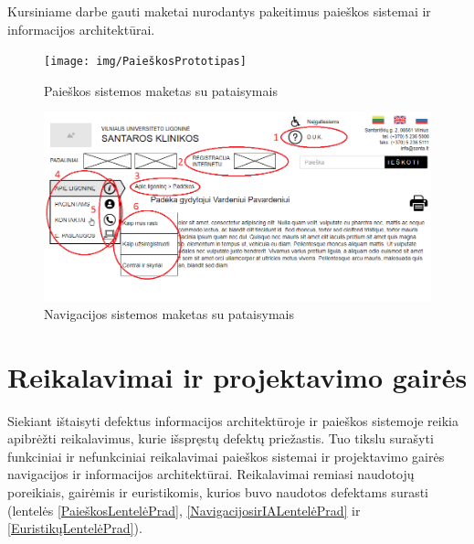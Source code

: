 \documentclass{VUMIFPSkursinis}
\begin{document}
Kursiniame darbe gauti maketai nurodantys pakeitimus paieškos sistemai ir informacijos architektūrai.

\begin{figure}[H]
    \centering
    \texttt{[image: img/PaieškosPrototipas]}
    \caption{Paieškos sistemos maketas su pataisymais}
    \label{img:PaieškosPrototipas}
\end{figure}

\begin{figure}[H]
    \centering
    \includegraphics[scale=0.65]{img/NavigacijosPrototipas}
    \caption{Navigacijos sistemos maketas su pataisymais}
    \label{img:NavigacijosPrototipas}
\end{figure}

\section{Reikalavimai ir projektavimo gairės}
Siekiant ištaisyti defektus informacijos architektūroje ir paieškos sistemoje reikia apibrėžti reikalavimus, kurie išspręstų defektų priežastis. Tuo tikslu surašyti funkciniai ir nefunkciniai reikalavimai paieškos sistemai ir projektavimo gairės navigacijos ir informacijos architektūrai. Reikalavimai remiasi naudotojų poreikiais, gairėmis ir euristikomis, kurios buvo naudotos defektams surasti (lentelės \ref{PaieškosLentelėPrad}, \ref{NavigacijosirIALentelėPrad} ir \ref{EuristikųLentelėPrad}).
\end{document}
